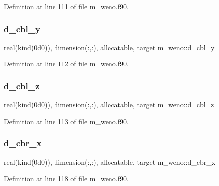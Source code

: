 Definition at line 111 of file m\+\_\+weno.\+f90.

\mbox{\label{namespacem__weno_a125fdee7148fefc8b5e6d35daece70d5}} 
\subsubsection{\texorpdfstring{d\+\_\+cbl\+\_\+y}{d\_cbl\_y}}
{\footnotesize\ttfamily real(kind(0d0)), dimension(\+:,\+:), allocatable, target m\+\_\+weno\+::d\+\_\+cbl\+\_\+y}



Definition at line 112 of file m\+\_\+weno.\+f90.

\mbox{\label{namespacem__weno_aa79c790927be06b0b135c5d6e2a745af}} 
\subsubsection{\texorpdfstring{d\+\_\+cbl\+\_\+z}{d\_cbl\_z}}
{\footnotesize\ttfamily real(kind(0d0)), dimension(\+:,\+:), allocatable, target m\+\_\+weno\+::d\+\_\+cbl\+\_\+z}



Definition at line 113 of file m\+\_\+weno.\+f90.

\mbox{\label{namespacem__weno_a91ff94c189407ac68a278d95054d86b7}} 
\subsubsection{\texorpdfstring{d\+\_\+cbr\+\_\+x}{d\_cbr\_x}}
{\footnotesize\ttfamily real(kind(0d0)), dimension(\+:,\+:), allocatable, target m\+\_\+weno\+::d\+\_\+cbr\+\_\+x}



Definition at line 118 of file m\+\_\+weno.\+f90.

\mbox{\label{namespacem__weno_a4ba1bee6ea194265fb96686ee57c877c}} 
